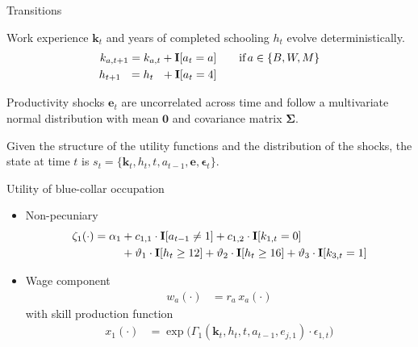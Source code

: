 \begin{frame}{Transitions}\vspace{0.25cm}

  Work experience $\bm{k}_t$  and years of completed schooling $h_t$ evolve deterministically.
  \begin{align*}
  k_{a,t+1} = k_{a,t} + {\textbf{I}}[a_t = a]  &\qquad \text{if}\, a \in \{B, W, M\} \\
  h_{t + 1\phantom{,a}} = h_{t\phantom{,a}} +   {\textbf{I}}[a_t = 4]  &\qquad
  \end{align*}

Productivity shocks $\bm{e}_t$ are uncorrelated across time and follow a multivariate normal distribution with mean $\bm{0}$ and covariance matrix $\bm{\Sigma}$.

Given the structure of the utility functions and the distribution of the shocks, the state at time $t$ is $s_t = \{\bm{k}_t, h_t, t, a_{t -1}, \bm{e},\bm{\epsilon}_t\}$.

\end{frame}
\begin{frame}{Utility of blue-collar occupation}\vspace{0.25cm}

	\begin{itemize}\setlength\itemsep{1em}
	\item Non-pecuniary
  \begin{align*}
  \zeta_{1}(\cdot)  = \alpha_1 & + c_{1,1} \cdot {\textbf{I}}[a_{t-1} \neq 1] + c_{1,2} \cdot {\textbf{I}}[k_{1,t} = 0] \\
                              & + \vartheta_1 \cdot {\textbf{I}}[h_t \geq 12] + \vartheta_2 \cdot {\textbf{I}}[h_t \geq 16] + \vartheta_3 \cdot {\textbf{I}}[k_{3,t} = 1]
  \end{align*}

	 \item Wage component
	 \begin{align*}
	 w_{a}(\cdot) & = r_{a} \, x_{a}(\cdot)
	 \end{align*}
	 with skill production function
	 \begin{align*}
	 x_{1}(\cdot) & = \exp \big( \Gamma_{1}(\bm{k}_t,  h_t, t, a_{t-1}, e_{j,1}) \cdot \epsilon_{1,t} \big)
	 \end{align*}

 \end{itemize}
\end{frame}
